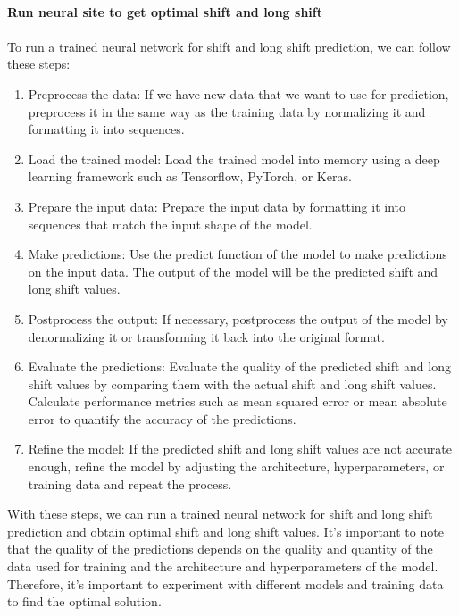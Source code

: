         \\
        \textbf{Run neural site to get optimal shift and long shift}\\
        \\
        To run a trained neural network for shift and long shift prediction, we can follow these steps:
        \begin{enumerate}
            \item Preprocess the data: If we have new data that we want to use for prediction, preprocess it in the
            same way as the training data by normalizing it and formatting it into sequences.
            \item Load the trained model: Load the trained model into memory using a deep learning framework such as
            Tensorflow, PyTorch, or Keras.
            \item Prepare the input data: Prepare the input data by formatting it into sequences that match the input
            shape of the model.
            \item Make predictions: Use the predict function of the model to make predictions on the input data.
            The output of the model will be the predicted shift and long shift values.
            \item Postprocess the output: If necessary, postprocess the output of the model by denormalizing it or
            transforming it back into the original format.
            \item Evaluate the predictions: Evaluate the quality of the predicted shift and long shift values by
            comparing them with the actual shift and long shift values. Calculate performance metrics such as mean
            squared error or mean absolute error to quantify the accuracy of the predictions.
            \item Refine the model: If the predicted shift and long shift values are not accurate enough,
            refine the model by adjusting the architecture, hyperparameters, or training data and repeat the process.
        \end{enumerate}
        With these steps, we can run a trained neural network for shift and long shift prediction and obtain optimal
        shift and long shift values. It's important to note that the quality of the predictions depends on the
        quality and quantity of the data used for training and the architecture and hyperparameters of the model.
        Therefore, it's important to experiment with different models and training data to find the optimal solution.
